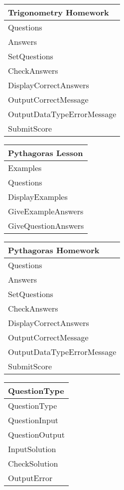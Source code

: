 \begin{center}
\begin{tabular}{|p{5cm}|} \hline
Trigonometry Homework \\ \hline
Questions \\
Answers \\ \hline
SetQuestions \\
CheckAnswers \\
DisplayCorrectAnswers \\
OutputCorrectMessage \\
OutputDataTypeErrorMessage \\
SubmitScore \\ \hline
\end{tabular}
\end{center}

\begin{center}
\begin{tabular}{|p{5cm}|} \hline
Pythagoras Lesson \\ \hline
Examples \\
Questions \\ \hline
DisplayExamples \\
GiveExampleAnswers \\
GiveQuestionAnswers \\ \hline
\end{tabular}
\end{center}

\begin{center}
\begin{tabular}{|p{5cm}|} \hline
Pythagoras Homework \\ \hline
Questions \\
Answers \\ \hline
SetQuestions \\
CheckAnswers \\
DisplayCorrectAnswers \\
OutputCorrectMessage \\
OutputDataTypeErrorMessage \\
SubmitScore \\ \hline
\end{tabular}
\end{center}

\begin{center}
\begin{tabular}{|p{5cm}|} \hline
QuestionType \\ \hline
QuestionType \\
QuestionInput \\
QuestionOutput \\ \hline
InputSolution \\
CheckSolution \\
OutputError \\ \hline
\end{tabular}
\end{center}

